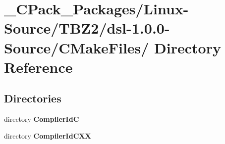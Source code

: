 \section{\_\-CPack\_\-Packages/Linux-\/Source/TBZ2/dsl-\/1.0.0-\/Source/CMakeFiles/ Directory Reference}
\label{dir_e46d182b72866ecb91a925fb74abba7f}
\subsection*{Directories}
\begin{DoxyCompactItemize}
\item 
directory {\bf CompilerIdC}
\item 
directory {\bf CompilerIdCXX}
\end{DoxyCompactItemize}
